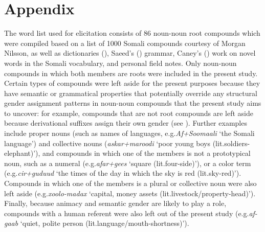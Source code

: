 \documentclass[output=paper]{langscibook}
\begin{document}
\section*{Appendix}
The word list used for elicitation consists of 86 noun-noun root compounds which were compiled based on a list of 1000 Somali compounds courtesy of Morgan Nilsson, as well as dictionaries (\citealt{Mansuur2012,Zorc1993}), Saeed's (\citeyear{Saeed1999a}) grammar, Caney's (\citeyear{Caney1984}) work on novel words in the Somali vocabulary, and personal field notes. Only noun-noun compounds in which both members are roots were included in the present study. Certain types of compounds were left aside for the present purposes because they have semantic or grammatical properties that potentially override any structural gender assignment patterns in noun-noun compounds that the present study aims to uncover: for example, compounds that are not root compounds are left aside because derivational suffixes assign their own gender (see ). Further examples include proper nouns (such as names of languages, e.g.\@ \textit{Af+Soomaali} `the Somali language') and collective nouns (\textit{askar+maroodi} `poor young boys (lit.\@ soldiers-elephant)'), and compounds in which one of the members is not a prototypical noun, such as a numeral (e.g.\@ \textit{afar+gees} `square (lit.\@ four-side)'), or a color term (e.g.\@ \textit{cir+guduud} `the times of the day in which the sky is red (lit.\@ sky-red)'). Compounds in which one of the members is a plural or collective noun were also left aside (e.g.\@ \textit{xoolo-madax} `capital, money assets (lit.\@ livestock/property-head)'). Finally, because animacy and semantic gender are likely to play a role, compounds with a human referent were also left out of the present study (e.g.\@ \textit{af-gaab} `quiet, polite person (lit.\@ language/mouth-shortness)').

{\sloppy\printbibliography[heading=subbibliography,notkeyword=this]}
\end{document}
